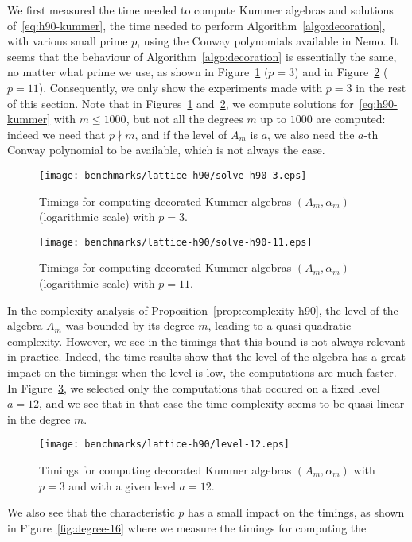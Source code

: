 We first measured the
time needed to compute Kummer algebras and solutions of~\eqref{eq:h90-kummer},
\ie the time needed to perform Algorithm~\ref{algo:decoration}, with various
small prime $p$, using the Conway polynomials available in Nemo. It seems that
the behaviour of Algorithm~\ref{algo:decoration} is essentially the same, no
matter what prime we use, as shown in Figure~\ref{fig:solve-h90-3} ($p=3$)
and in Figure~\ref{fig:solve-h90-11} ($p=11$). Consequently, we only show the
experiments made with $p=3$ in the rest of this section.
Note that in Figures~\ref{fig:solve-h90-3} and~\ref{fig:solve-h90-11}, we
compute solutions for~\eqref{eq:h90-kummer} with $m\leq1000$, but not all the
degrees $m$ up to $1000$ are computed: indeed we need that $p\nmid m$, and if
the level of $A_m$ is $a$, we also need the $a$-th Conway polynomial to be
available, which is not always the case.
\begin{figure}
  \centering
  \texttt{[image: benchmarks/lattice-h90/solve-h90-3.eps]}
  \caption{Timings for computing decorated Kummer algebras $(A_m, \alpha_m)$ (logarithmic scale)
  with $p=3$.}
  \label{fig:solve-h90-3}
\end{figure}
\begin{figure}
  \centering
  \texttt{[image: benchmarks/lattice-h90/solve-h90-11.eps]}
  \caption{Timings for computing decorated Kummer algebras $(A_m, \alpha_m)$ (logarithmic scale)
  with $p=11$.}
  \label{fig:solve-h90-11}
\end{figure}
In the complexity analysis of Proposition~\ref{prop:complexity-h90}, the level
of the algebra $A_m$ was bounded by its degree $m$, leading to a quasi-quadratic
complexity. However, we see in the timings that this bound is not always
relevant in practice. Indeed, the time results show that the level of the
algebra has a great impact on the timings: when the level is low, the
computations are much faster. In Figure~\ref{fig:level-12}, we selected only the
computations that occured on a fixed level $a=12$, and we see that in that case
the time complexity seems to be quasi-linear in the degree $m$.
\begin{figure}
  \centering
  \texttt{[image: benchmarks/lattice-h90/level-12.eps]}
  \caption{Timings for computing decorated Kummer algebras $(A_m, \alpha_m)$ 
  with $p=3$ and with a given level $a=12$.}
  \label{fig:level-12}
\end{figure}
We also see that the characteristic $p$ has a small impact on the timings, as shown
in Figure~\ref{fig:degree-16} where we measure the timings for computing the
